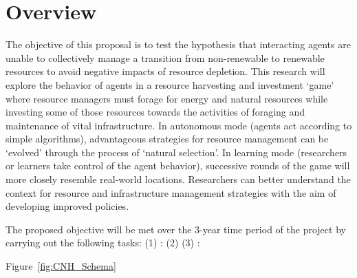 \documentclass[11pt,a4paper]{article}
\begin{document}




\section*{Overview}
\vspace*{-0.1in}


The objective of this proposal is to test the hypothesis that 
interacting agents are unable to collectively manage 
a transition from non-renewable to renewable resources 
to avoid negative impacts of resource depletion. 
This research will explore the behavior of agents in 
a resource harvesting and investment `game' where 
resource managers must forage for energy and natural resources 
while investing some of those resources towards the activities of 
foraging and maintenance of vital infrastructure. 
In autonomous mode (agents act according to simple algorithms), 
advantageous strategies for resource management can be 
`evolved' through the process of `natural selection'. 
In learning mode (researchers or learners take control of the agent behavior), 
successive rounds of the game will more closely resemble real-world locations. 
Researchers can better understand the context for 
resource and infrastructure management strategies with the aim of developing improved policies.

The proposed objective will be met over the 3-year time period of the project by carrying out the following tasks:
(1)	\emph{}: 	\label{task:}
(2)	\emph{	}	\label{task:}
(3)	\emph{}: 	\label{task:}

Figure~\ref{fig:CNH_Schema}
\end{document}
